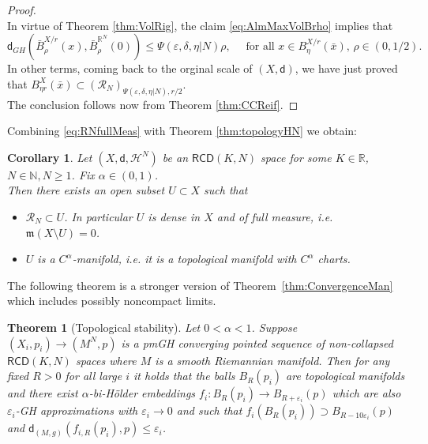 \documentclass[a4paper]{amsart}
\theoremstyle{plain}
\newtheorem{theorem}[lemma]{Theorem}
\newtheorem{corollary}[lemma]{Corollary}
\theoremstyle{definition}
\numberwithin{equation}{section}
\newcommand{\R}{\mathbb{R}}
\newcommand{\N}{\mathbb{N}}
\newcommand{\RCD}{\mathsf{RCD}}
\newcommand{\mm}{\mathfrak m}
\newcommand{\sfd}{\mathsf d}
\newcommand{\cR}{\mathcal{R}}
\newcommand{\cH}{\mathcal{H}}
\newcommand{\eps}{\varepsilon}
\begin{document}
{\begin{proof}
\\In virtue of Theorem \ref{thm:VolRig},  the claim \eqref{eq:AlmMaxVolBrho} implies that
\begin{equation}\label{eq:dGHBrho}
\sfd_{GH}(\bar{B}_{\rho}^{X/r}(x), \bar{B}_{\rho}^{\R^{N}}(0))\leq \Psi(\varepsilon,\delta, \eta|N) \rho,  \quad \text{ for all } x\in B^{X/r}_{\eta}(\bar{x}), \,  \rho\in (0, 1/2).
\end{equation}
In other terms,  coming back to the orginal scale of $(X,\sfd)$, we have just proved that  $B^{X}_{\eta r}(\bar{x})\subset (\cR_{N})_{\Psi(\varepsilon,\delta, \eta|N),r/2}.$
\\ The conclusion follows now from Theorem \ref{thm:CCReif}.
\end{proof}

{Combining \eqref{eq:RNfullMeas} with Theorem \ref{thm:topologyHN} we obtain:}
\begin{corollary}
Let $(X,\sfd, \cH^{N})$ be an $\RCD(K,N)$ space for some $K\in \R$,  $N\in \N, N\geq 1$. Fix $\alpha\in (0,1)$.
\\Then there exists an open subset $U\subset X$ such that
\begin{itemize}
 \item $\cR_{N}\subset U$. In particular $U$ is dense in $X$ and of full measure, i.e. $\mm(X\setminus U)=0$.
\item $U$ is a $C^{\alpha}$-manifold, i.e. it is a topological manifold  with $C^{\alpha}$ charts.
 \end{itemize}
\end{corollary}



The following theorem is a stronger version of Theorem~\ref{thm:ConvergenceMan} which includes possibly noncompact limits.
\begin{theorem}[Topological stability]\label{top-stability-RCD}
Let $0<\alpha<1$.
Suppose $(X_i,p_i)\to (M^N,p)$ is a pmGH converging pointed sequence of non-collapsed $\RCD(K,N)$ spaces where $M$ is a smooth Riemannian manifold. Then
for any fixed $R>0$ for all large $i$  it holds that the balls $B_R(p_i)$ are  topological manifolds and there exist $\alpha$-bi-H\"older embeddings $f_{i}:B_R(p_i)\to  {B_{R+\eps_i}(p)}$ which are also $\eps_i$-GH approximations with $\eps_i\to 0$ and such that
$f_i(B_R(p_i))\supset B_{R-10\eps_i}(p)$ and $\sfd_{(M,g)}(f_{i,R}(p_i),p)\le \eps_i$.


\end{theorem}}
\end{document}
